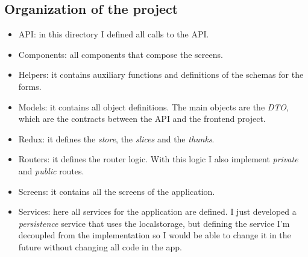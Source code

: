     \subsection{Organization of the project}
        \begin{itemize}[noitemsep]
            \item API: in this directory I defined all calls to the API.
            \item Components: all components that compose the screens.
            \item Helpers: it contains auxiliary functions and definitions of the schemas for the forms.
            \item Models: it contains all object definitions. The main objects are the \textit{DTO}, which are the contracts between the API and the frontend project.
            \item Redux: it defines the \textit{store}, the \textit{slices} and the \textit{thunks}. 
            \item Routers: it defines the router logic. With this logic I also implement \textit{private} and \textit{public} routes.
            \item Screens: it contains all the screens of the application.
            \item Services: here all services for the application are defined. I just developed a \textit{persistence} service that uses the localstorage, but defining the service I'm decoupled from the implementation so I would be able to change it in the future without changing all code in the app.
        \end{itemize}


